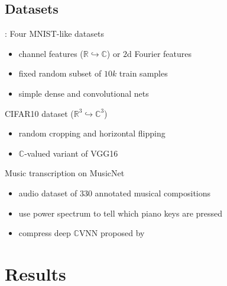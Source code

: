 \documentclass{beamer}
\newcommand{\real}{\mathbb{R}}
\newcommand{\cplx}{\mathbb{C}}
\begin{document}

\subsection{Datasets} %
\label{sub:datasets}

\begin{frame}[t]{\insertsection: \insertsubsection}
  Four MNIST-like datasets
  \begin{itemize}
    \item channel features ($\real \hookrightarrow \cplx$) or $2$d Fourier features
    \item fixed random subset of $10k$ train samples
    \item simple dense and convolutional nets
  \end{itemize}

  \pause
  \medskip
  CIFAR10 dataset ($\real^3 \hookrightarrow \cplx^3$)
  \begin{itemize}
    \item random cropping and horizontal flipping
    \item $\cplx$-valued variant of VGG16 {\tiny \citep{simonyan_very_2015}}
  \end{itemize}

  \pause
  \medskip
  Music transcription on MusicNet {\tiny \citep{thickstun_learning_2017}}
  \begin{itemize}
    \item audio dataset of $330$ annotated musical compositions
    \item use power spectrum to tell which piano keys are pressed
    \item compress deep $\cplx$VNN proposed by \citep{trabelsi_deep_2018}
  \end{itemize}

\end{frame}



\section{Results} %
\label{sec:results}
\end{document}
